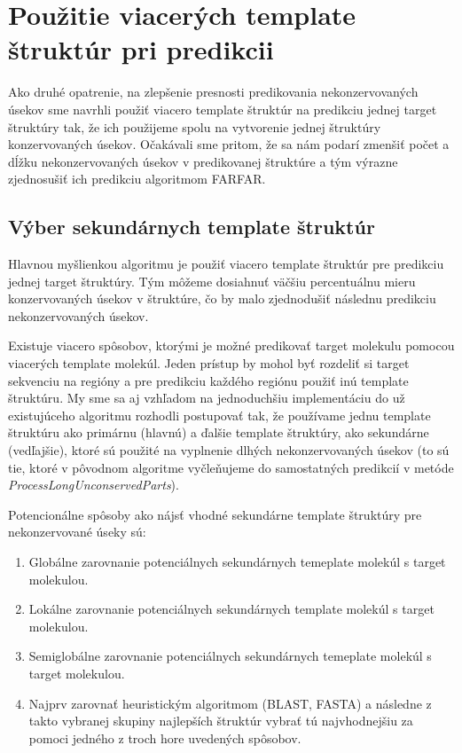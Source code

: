 \chapter{Použitie viacerých template štruktúr pri predikcii}

Ako druhé opatrenie, na zlepšenie presnosti predikovania nekonzervovaných úsekov sme navrhli  použiť viacero template štruktúr na predikciu jednej target štruktúry tak, že ich použijeme spolu na vytvorenie jednej štruktúry konzervovaných úsekov. Očakávali sme pritom, že sa nám podarí zmenšiť počet a dĺžku nekonzervovaných úsekov v predikovanej štruktúre a tým výrazne zjednosušiť ich predikciu algoritmom FARFAR.

\section{Výber sekundárnych template štruktúr}
Hlavnou myšlienkou algoritmu je použiť viacero template štruktúr pre predikciu jednej target štruktúry. Tým môžeme dosiahnuť väčšiu percentuálnu mieru konzervovaných úsekov v štruktúre, čo by malo zjednodušiť následnu predikciu nekonzervovaných úsekov.


\indent  Existuje viacero spôsobov, ktorými je možné predikovať target molekulu pomocou viacerých template molekúl. Jeden prístup by mohol byť rozdeliť si target sekvenciu na regióny a pre predikciu každého regiónu použiť inú template štruktúru. My sme sa aj vzhľadom na jednoduchšiu implementáciu do už existujúceho algoritmu rozhodli postupovať tak, že používame jednu template štruktúru ako primárnu (hlavnú) a ďalšie template štruktúry, ako sekundárne (vedľajšie), ktoré sú použité na vyplnenie dlhých nekonzervovaných úsekov (to sú tie, ktoré v pôvodnom algoritme vyčleňujeme do samostatných predikcií v metóde \textit{ProcessLongUnconservedParts}).    


\indent Potencionálne spôsoby ako nájsť vhodné sekundárne template štruktúry pre nekonzervované úseky sú: 
\begin{enumerate}
\item Globálne zarovnanie potenciálnych sekundárnych temeplate molekúl s target molekulou. 
\item Lokálne zarovnanie potenciálnych sekundárnych template molekúl s target molekulou. 
\item Semiglobálne zarovnanie potenciálnych sekundárnych temeplate molekúl s target molekulou. 
\item Najprv zarovnať heuristickým algoritmom (BLAST, FASTA) \cite{BLAST} a následne z takto vybranej skupiny najlepších štruktúr vybrať tú najvhodnejšiu za pomoci jedného z troch hore uvedených spôsobov.
\end{enumerate}


